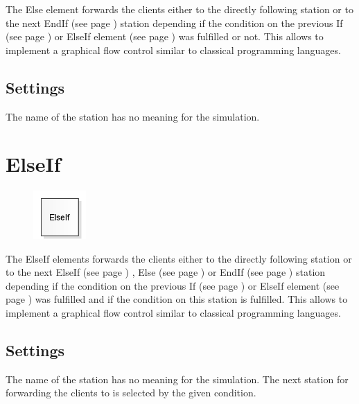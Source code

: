 The Else element forwards the clients either to the directly following station or to the
next EndIf (see page \pageref{ref:ModelElementLogicEndIf}) station depending if the condition
on the previous If (see page \pageref{ref:ModelElementLogicIf}) or
ElseIf element (see page \pageref{ref:ModelElementLogicElseIf}) was fulfilled or not.
This allows to implement a graphical flow control similar to classical programming
languages.

\subsection*{Settings}

The name of the station has no meaning for the simulation.


\section{ElseIf}
\label{ref:ModelElementLogicElseIf}

\begin{figure}
\vspace{-22pt}
\includegraphics[width=2cm]{imageModelElementLogicElseIf.png}
\vspace{-22pt}
\end{figure}

The ElseIf elements forwards the clients either to the directly following station or to the
next ElseIf (see page \pageref{ref:ModelElementLogicElseIf}) ,
Else (see page \pageref{ref:ModelElementLogicElse}) or
EndIf (see page \pageref{ref:ModelElementLogicEndIf}) station depending if the condition
on the previous If (see page \pageref{ref:ModelElementLogicIf}) or
ElseIf element (see page \pageref{ref:ModelElementLogicElseIf}) was fulfilled and if the
condition on this station is fulfilled.
This allows to implement a graphical flow control similar to classical programming
languages.	

\subsection*{Settings}

The name of the station has no meaning for the simulation.
The next station for forwarding the clients to is selected by the given condition.


